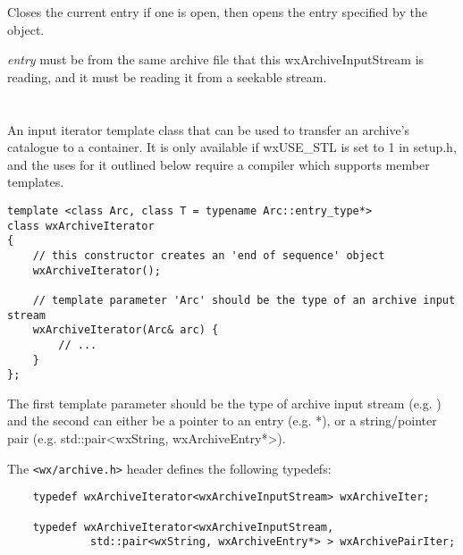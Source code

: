 \label{wxarchiveinputstreamopenentry}


Closes the current entry if one is open, then opens the entry specified
by the  object.

{\it entry} must be from the same archive file that this
wxArchiveInputStream is reading, and it must be reading it from a
seekable stream.




%
%

\section{}\label{wxarchiveiterator}

An input iterator template class that can be used to transfer an archive's
catalogue to a container. It is only available if wxUSE\_STL is set to 1
in setup.h, and the uses for it outlined below require a compiler which
supports member templates.

\begin{verbatim}
template <class Arc, class T = typename Arc::entry_type*>
class wxArchiveIterator
{
    // this constructor creates an 'end of sequence' object
    wxArchiveIterator();

    // template parameter 'Arc' should be the type of an archive input stream
    wxArchiveIterator(Arc& arc) {
        // ...
    }
};
\end{verbatim}

The first template parameter should be the type of archive input stream
(e.g. ) and the
second can either be a pointer to an entry
(e.g. *), or a string/pointer pair
(e.g. std::pair<wxString, wxArchiveEntry*>).

The {\tt <wx/archive.h>} header defines the following typedefs:

\begin{verbatim}
    typedef wxArchiveIterator<wxArchiveInputStream> wxArchiveIter;

    typedef wxArchiveIterator<wxArchiveInputStream,
             std::pair<wxString, wxArchiveEntry*> > wxArchivePairIter;
\end{verbatim}

